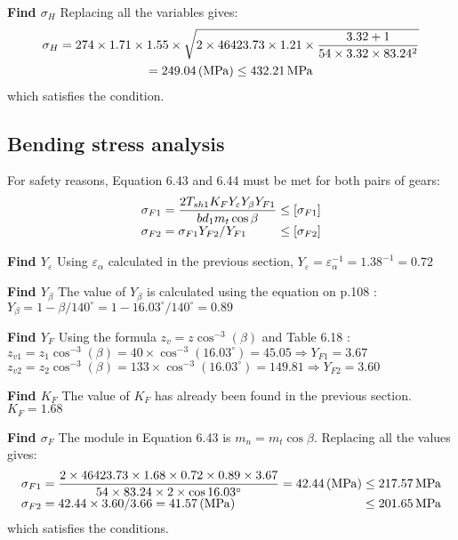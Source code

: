 \textbf{Find $ \sigma_H $} Replacing all the variables gives:
\begin{multline*}
\sigma_H = 274\times 1.71 \times 1.55 \times \sqrt{2\times 46423.73 \times 1.21 \times\dfrac{3.32+1}{54 \times 3.32 \times 83.24^2}}\\
= 249.04 \, (\mathrm{MPa}) \leq 432.21 \, \mathrm{MPa}
\end{multline*}
which satisfies the condition.
\subsection{Bending stress analysis}
For safety reasons, Equation 6.43 and 6.44 \cite{tk1} must be met for both pairs of gears:
\[
\begin{array}{l@{{} \leq {}}l}
\sigma_{F1} = \dfrac{2T_{sh1}K_FY_\varepsilon Y_\beta Y_{F1}}{bd_1m_t\cos\beta} & [\sigma_{F1}]\\ 
\sigma_{F2} = \sigma_{F1}Y_{F2}/Y_{F1} & [\sigma_{F2}]
\end{array}
\]

\textbf{Find $ Y_\varepsilon $} Using $ \varepsilon_\alpha $ calculated in the previous section, 
$ Y_\varepsilon= \varepsilon_\alpha^{-1} = 1.38^{-1} = 0.72 $

\textbf{Find $ Y_\beta $} The value of $ Y_\beta $ is calculated using the equation on p.108 \cite{tk1}:\\
$ Y_\beta = 1-{\beta}/{140^\circ}=  1-{16.03^\circ}/{140^\circ}= 0.89$

\textbf{Find $ Y_F $} Using the formula $ z_v = z\cos^{-3}(\beta) $ and Table 6.18 \cite{tk1}:\\
$ z_{v1} = z_1\cos^{-3}(\beta) = 40\times\cos^{-3}(16.03^\circ) = 45.05\Rightarrow Y_{F1} = 3.67 $\\
$ z_{v2} = z_2\cos^{-3}(\beta) = 133\times\cos^{-3}(16.03^\circ) = 149.81\Rightarrow Y_{F2} = 3.60 $

\textbf{Find $ K_F $} The value of $ K_F $ has already been found in the previous section. $ K_F = 1.68 $

\textbf{Find $ \sigma_F $} The module in Equation 6.43 \cite{tk1} is $ m_n = m_t\cos\beta $. Replacing all the values gives:
\[
\begin{array}{l@{{} \leq {}}l}
\sigma_{F1} = \dfrac{2\times 46423.73 \times 1.68 \times 0.72 \times 0.89 \times 3.67}{54 \times 83.24 \times 2 \times\cos16.03^\circ} = 42.44 \unitp{MPa} & 217.57 \unit{MPa}\\ 
\sigma_{F2} = {42.44 \times 3.60}/{3.66} = 41.57 \unitp{MPa}& 201.65 \unit{MPa}
\end{array}
\]
which satisfies the conditions.
